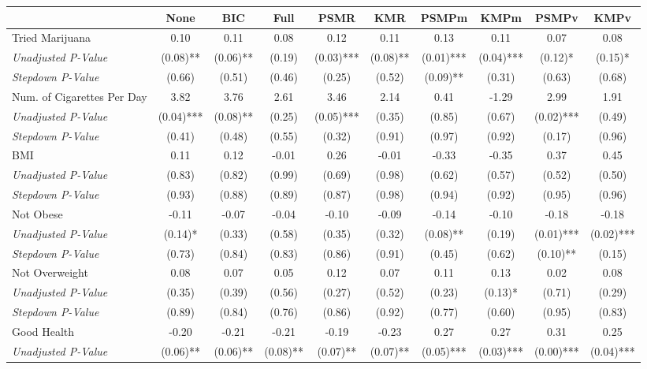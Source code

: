 \begin{tabular}{l c c c c c c c c c}
\toprule
 & None & BIC & Full & PSMR & KMR & PSMPm & KMPm & PSMPv & KMPv \\
\midrule
Tried Marijuana & 0.10 & 0.11 & 0.08 & 0.12 & 0.11 & 0.13 & 0.11 & 0.07 & 0.08 \\
\quad \textit{Unadjusted P-Value} & (0.08)** & (0.06)** & (0.19) & (0.03)*** & (0.08)** & (0.01)*** & (0.04)*** & (0.12)* & (0.15)* \\
\quad \textit{Stepdown P-Value} & (0.66) & (0.51) & (0.46) & (0.25) & (0.52) & (0.09)** & (0.31) & (0.63) & (0.68) \\
Num. of Cigarettes Per Day & 3.82 & 3.76 & 2.61 & 3.46 & 2.14 & 0.41 & -1.29 & 2.99 & 1.91 \\
\quad \textit{Unadjusted P-Value} & (0.04)*** & (0.08)** & (0.25) & (0.05)*** & (0.35) & (0.85) & (0.67) & (0.02)*** & (0.49) \\
\quad \textit{Stepdown P-Value} & (0.41) & (0.48) & (0.55) & (0.32) & (0.91) & (0.97) & (0.92) & (0.17) & (0.96) \\
BMI & 0.11 & 0.12 & -0.01 & 0.26 & -0.01 & -0.33 & -0.35 & 0.37 & 0.45 \\
\quad \textit{Unadjusted P-Value} & (0.83) & (0.82) & (0.99) & (0.69) & (0.98) & (0.62) & (0.57) & (0.52) & (0.50) \\
\quad \textit{Stepdown P-Value} & (0.93) & (0.88) & (0.89) & (0.87) & (0.98) & (0.94) & (0.92) & (0.95) & (0.96) \\
Not Obese & -0.11 & -0.07 & -0.04 & -0.10 & -0.09 & -0.14 & -0.10 & -0.18 & -0.18 \\
\quad \textit{Unadjusted P-Value} & (0.14)* & (0.33) & (0.58) & (0.35) & (0.32) & (0.08)** & (0.19) & (0.01)*** & (0.02)*** \\
\quad \textit{Stepdown P-Value} & (0.73) & (0.84) & (0.83) & (0.86) & (0.91) & (0.45) & (0.62) & (0.10)** & (0.15) \\
Not Overweight & 0.08 & 0.07 & 0.05 & 0.12 & 0.07 & 0.11 & 0.13 & 0.02 & 0.08 \\
\quad \textit{Unadjusted P-Value} & (0.35) & (0.39) & (0.56) & (0.27) & (0.52) & (0.23) & (0.13)* & (0.71) & (0.29) \\
\quad \textit{Stepdown P-Value} & (0.89) & (0.84) & (0.76) & (0.86) & (0.92) & (0.77) & (0.60) & (0.95) & (0.83) \\
Good Health & -0.20 & -0.21 & -0.21 & -0.19 & -0.23 & 0.27 & 0.27 & 0.31 & 0.25 \\
\quad \textit{Unadjusted P-Value} & (0.06)** & (0.06)** & (0.08)** & (0.07)** & (0.07)** & (0.05)*** & (0.03)*** & (0.00)*** & (0.04)*** \\

\end{tabular}
